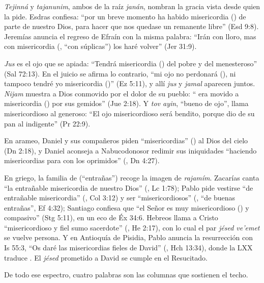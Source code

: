 \emph{Tejinná} y \emph{tajanunim}, ambos de la raíz \emph{janán}, nombran la gracia vista desde quien la pide. Esdras confiesa: ``por un breve momento ha habido misericordia () de parte de \SENOR{} nuestro Dios, para hacer que nos quedase un remanente libre'' (Esd 9:8). Jeremías anuncia el regreso de Efraín con la misma palabra: ``Irán con lloro, mas con misericordia (, ``con súplicas'') los haré volver'' (Jer 31:9).

\emph{Jus} es el ojo que se apiada: ``Tendrá misericordia () del pobre y del menesteroso'' (Sal 72:13). En el juicio se afirma lo contrario, ``mi ojo no perdonará (), ni tampoco tendré yo misericordia ()'' (Ez 5:11), y allí \emph{jus} y \emph{jamal} aparecen juntos. \emph{Nijam} muestra a Dios conmovido por el dolor de su pueblo: ``\SENOR{} era movido a misericordia () por sus gemidos'' (Jue 2:18). Y \emph{tov ayin}, ``bueno de ojo'', llama misericordioso al generoso: ``El ojo misericordioso será bendito, porque dio de su pan al indigente'' (Pr 22:9).

En arameo, Daniel y sus compañeros piden ``misericordias'' () al Dios del cielo (Dn 2:18), y Daniel aconseja a Nabucodonosor redimir sus iniquidades ``haciendo misericordias para con los oprimidos'' (, Dn 4:27).

En griego, la familia de  (``entrañas'') recoge la imagen de \emph{rajamím}. Zacarías canta ``la entrañable misericordia de nuestro Dios'' (, Lc 1:78); Pablo pide vestirse ``de entrañable misericordia'' (, Col 3:12) y ser ``misericordiosos'' (, ``de buenas entrañas'', Ef 4:32); Santiago confiesa que ``el Señor es muy misericordioso () y compasivo'' (Stg 5:11), en un eco de Éx 34:6. Hebreos llama a Cristo ``misericordioso y fiel sumo sacerdote'' (, He 2:17), con lo cual el par \emph{jésed ve'emet} se vuelve persona. Y en Antioquía de Pisidia, Pablo anuncia la resurrección con Is 55:3, ``Os daré las misericordias fieles de David'' (, Hch 13:34), donde la LXX traduce . El \emph{jésed} prometido a David se cumple en el Resucitado.


De todo ese espectro, cuatro palabras son las columnas que sostienen el techo.

